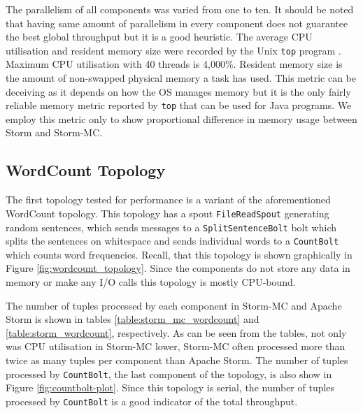 \documentclass[bsc,twoside,singlespacing,normalheadings,parskip]{infthesis}\usepackage[]{graphicx}\usepackage[]{color}
\begin{document}
The parallelism of all components was varied from one to ten. It should be noted that having same amount of parallelism in every component does not guarantee the best global throughput but it is a good heuristic. The average CPU utilisation and resident memory size were recorded by the Unix \texttt{top} program \citep{UnixTop}. Maximum CPU utilisation with 40 threads is 4,000\%. Resident memory size is the amount of non-swapped physical memory a task has used. This metric can be deceiving as it depends on how the OS manages memory but it is the only fairly reliable memory metric reported by \texttt{top} that can be used for Java programs. We employ this metric only to show proportional difference in memory usage between Storm and Storm-MC.

\subsection{WordCount Topology}

The first topology tested for performance is a variant of the aforementioned WordCount topology. This topology has a spout \texttt{FileReadSpout} generating random sentences, which sends messages to a \texttt{SplitSentenceBolt} bolt which splits the sentences on whitespace and sends individual words to a \texttt{CountBolt} which counts word frequencies. Recall, that this topology is shown graphically in Figure \ref{fig:wordcount_topology}. Since the components do not store any data in memory or make any I/O calls this topology is mostly CPU-bound.

The number of tuples processed by each component in Storm-MC and Apache Storm is shown in tables \ref{table:storm_mc_wordcount} and \ref{table:storm_wordcount}, respectively. As can be seen from the tables, not only was CPU utilisation in Storm-MC lower, Storm-MC often processed more than twice as many tuples per component than Apache Storm.  The number of tuples processed by \texttt{CountBolt}, the last component of the topology, is also show in Figure \ref{fig:countbolt-plot}. Since this topology is serial, the number of tuples processed by \texttt{CountBolt} is a good indicator of the total throughput.
\end{document}
